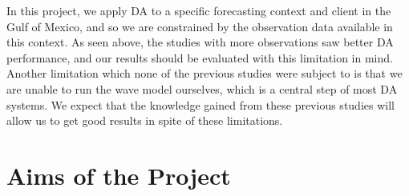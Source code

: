 In this project, we apply DA to a specific forecasting context and client in the Gulf of Mexico, and so we are constrained by the observation data available in this context. As seen above, the studies with more observations saw better DA performance, and our results should be evaluated with this limitation in mind. Another limitation which none of the previous studies were subject to is that we are unable to run the wave model ourselves, which is a central step of most DA systems. We expect that the knowledge gained from these previous studies will allow us to get good results in spite of these limitations.

%
%


\section{Aims of the Project}
\label{sec:aim}


